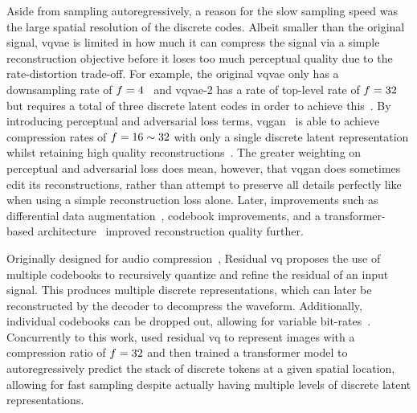 Aside from sampling autoregressively, a reason for the slow sampling speed was
the large spatial resolution of the discrete codes. Albeit smaller than the
original signal, \gls{vqvae} is limited in how much it can compress the signal
via a simple reconstruction objective before it loses too much perceptual
quality due to the rate-distortion trade-off. For example, the original
\gls{vqvae} only has a downsampling rate of
$f=4$~\cite{oord2017vqvae} and \gls{vqvae}-2 has a rate of
top-level rate of $f=32$ but requires a total of three discrete
latent codes in order to achieve this~\cite{razavi2019generating}. By
introducing perceptual and adversarial loss terms,
\gls{vqgan}~\cite{esser2021taming} is able to achieve compression rates of
$f=16 \sim 32$ with only a single discrete latent representation
whilst retaining high quality reconstructions~\cite{esser2021taming}. The
greater weighting on perceptual and adversarial loss does mean, however, that
\gls{vqgan} does sometimes edit its reconstructions, rather than attempt to
preserve all details perfectly like when using a simple reconstruction loss
alone. Later, improvements such as differential data
augmentation~\cite{bondtaylor2021unleashing}, codebook improvements, and a
transformer-based architecture~\cite{yu2021vqgan} improved reconstruction
quality further.

Originally designed for audio compression~\cite{zeghidour2021soundstream},
Residual \gls{vq} proposes the use of multiple codebooks to recursively quantize
and refine the residual of an input signal. This produces multiple discrete
representations, which can later be reconstructed by the decoder to decompress
the waveform. Additionally, individual codebooks can be dropped out, allowing
for variable bit-rates~\cite{zeghidour2021soundstream}. Concurrently to this
work, \citet{lee2022rqvae} used residual \gls{vq} to represent images with a
compression ratio of $f=32$ and then trained a transformer model
to autoregressively predict the stack of discrete tokens at a given spatial
location, allowing for fast sampling despite actually having multiple levels of
discrete latent representations\cite{lee2022rqvae}.


